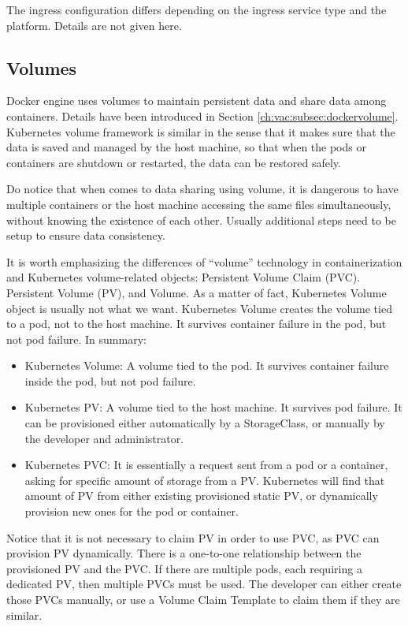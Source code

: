 The ingress configuration differs depending on the ingress service type and the platform. Details are not given here.

\subsection{Volumes} \label{ch:vac:subsec:k8svolume}

Docker engine uses volumes to maintain persistent data and share data among containers. Details have been introduced in Section \ref{ch:vac:subsec:dockervolume}. Kubernetes volume framework is similar in the sense that it makes sure that the data is saved and managed by the host machine, so that when the pods or containers are shutdown or restarted, the data can be restored safely.

Do notice that when comes to data sharing using volume, it is dangerous to have multiple containers or the host machine accessing the same files simultaneously, without knowing the existence of each other. Usually additional steps need to be setup to ensure data consistency.

It is worth emphasizing the differences of ``volume'' technology in containerization and Kubernetes volume-related objects: Persistent Volume Claim (PVC). Persistent Volume (PV), and Volume. As a matter of fact, Kubernetes Volume object is usually not what we want. Kubernetes Volume creates the volume tied to a pod, not to the host machine. It survives container failure in the pod, but not pod failure. In summary:
\begin{itemize}
	\item Kubernetes Volume: A volume tied to the pod. It survives container failure inside the pod, but not pod failure.
	\item Kubernetes PV: A volume tied to the host machine. It survives pod failure. It can be provisioned either automatically by a StorageClass, or manually by the developer and administrator.
	\item Kubernetes PVC: It is essentially a request sent from a pod or a container, asking for specific amount of storage from a PV. Kubernetes will find that amount of PV from either existing provisioned static PV, or dynamically provision new ones for the pod or container.
\end{itemize}
Notice that it is not necessary to claim PV in order to use PVC, as PVC can provision PV dynamically. There is a one-to-one relationship between the provisioned PV and the PVC. If there are multiple pods, each requiring a dedicated PV, then multiple PVCs must be used. The developer can either create those PVCs manually, or use a Volume Claim Template to claim them if they are similar.

